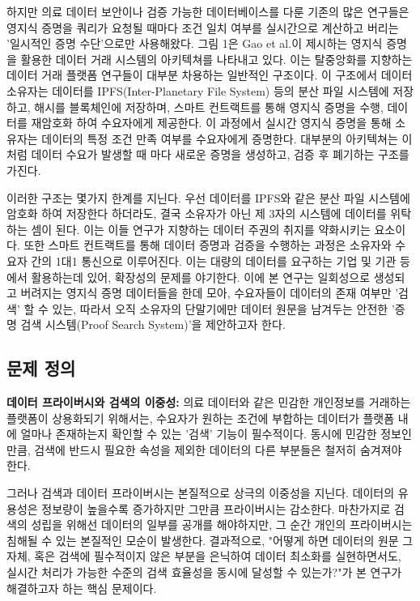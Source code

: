 하지만 의료 데이터 보안이나 검증 가능한 데이터베이스를 다룬 기존의 많은 연구들은 영지식 증명을 쿼리가 요청될 때마다 조건 일치 여부를 실시간으로 계산하고 버리는 '일시적인 증명 수단'으로만 사용해왔다. 그림 1은 Gao et al.이 제시하는 영지식 증명을 활용한 데이터 거래 시스템\cite{gao2024}의 아키텍쳐를 나타내고 있다. 이는 탈중앙화를 지향하는 데이터 거래 플랫폼 연구들이 대부분 차용하는 일반적인 구조이다. 이 구조에서 데이터 소유자는 데이터를 IPFS(Inter-Planetary File System) 등의 분산 파일 시스템에 저장하고, 해시를 블록체인에 저장하며, 스마트 컨트랙트를 통해 영지식 증명을 수행, 데이터를 재암호화 하여 수요자에게 제공한다. 이 과정에서 실시간 영지식 증명을 통해 소유자는 데이터의 특정 조건 만족 여부를 수요자에게 증명한다. 대부분의 아키텍쳐는 이처럼 데이터 수요가 발생할 때 마다 새로운 증명을 생성하고, 검증 후 폐기하는 구조를 가진다.

\bigskip

이러한 구조는 몇가지 한계를 지닌다. 우선 데이터를 IPFS와 같은 분산 파일 시스템에 암호화 하여 저장한다 하더라도, 결국 소유자가 아닌 제 3자의 시스템에 데이터를 위탁하는 셈이 된다. 이는 이들 연구가 지향하는 데이터 주권의 취지를 약화시키는 요소이다. 또한 스마트 컨트랙트를 통해 데이터 증명과 검증을 수행하는 과정은 소유자와 수요자 간의 1대1 통신으로 이루어진다. 이는 대량의 데이터를 요구하는 기업 및 기관 등에서 활용하는데 있어, 확장성의 문제를 야기한다. 이에 본 연구는 일회성으로 생성되고 버려지는 영지식 증명 데이터들을 한데 모아, 수요자들이 데이터의 존재 여부만 '검색' 할 수 있는, 따라서 오직 소유자의 단말기에만 데이터 원문을 남겨두는 안전한 '증명 검색 시스템(Proof Search System)'을 제안하고자 한다.

\subsection{문제 정의}

\textbf{데이터 프라이버시와 검색의 이중성:} 의료 데이터와 같은 민감한 개인정보를 거래하는 플랫폼이 상용화되기 위해서는, 수요자가 원하는 조건에 부합하는 데이터가 플랫폼 내에 얼마나 존재하는지 확인할 수 있는 '검색' 기능이 필수적이다. 동시에 민감한 정보인 만큼, 검색에 반드시 필요한 속성을 제외한 데이터의 다른 부분들은 철저히 숨겨져야 한다.

\bigskip

그러나 검색과 데이터 프라이버시는 본질적으로 상극의 이중성을 지닌다. 데이터의 유용성은 정보량이 높을수록 증가하지만 그만큼 프라이버시는 감소한다. 마찬가지로 검색의 성립을 위해선 데이터의 일부를 공개를 해야하지만, 그 순간 개인의 프라이버시는 침해될 수 있는 본질적인 모순이 발생한다. 결과적으로, "어떻게 하면 데이터의 원문 그 자체, 혹은 검색에 필수적이지 않은 부분을 은닉하여 데이터 최소화를 실현하면서도, 실시간 처리가 가능한 수준의 검색 효율성을 동시에 달성할 수 있는가?"가 본 연구가 해결하고자 하는 핵심 문제이다.

